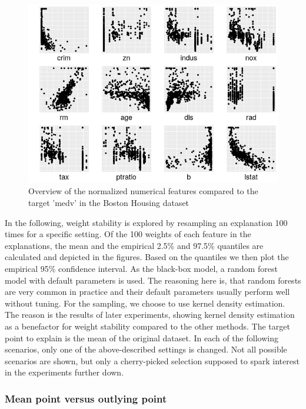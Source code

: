 \documentclass[
]{krantz}
\begin{document}
\begin{figure}

{\centering \includegraphics[width=9.72in]{images/boston_prezi} 

}

\caption{Overview of the normalized numerical features compared to the target 'medv' in the Boston Housing dataset}\label{fig:figboston}
\end{figure}

In the following, weight stability is explored by resampling an explanation 100 times for a specific setting.
Of the 100 weights of each feature in the explanations, the mean and the empirical 2.5\% and 97.5\% quantiles are calculated and depicted in the figures.
Based on the quantiles we then plot the empirical 95\% confidence interval.
As the black-box model, a random forest model with default parameters is used.
The reasoning here is, that random forests are very common in practice and their default parameters usually perform well without tuning.
For the sampling, we choose to use kernel density estimation.
The reason is the results of later experiments, showing kernel density estimation as a benefactor for weight stability compared to the other methods.
The target point to explain is the mean of the original dataset.
In each of the following scenarios, only one of the above-described settings is changed.
Not all possible scenarios are shown, but only a cherry-picked selection supposed to spark interest in the experiments further down.

\hypertarget{mean-point-versus-outlying-point}{%
\subsubsection{Mean point versus outlying point}\label{mean-point-versus-outlying-point}}
\end{document}
